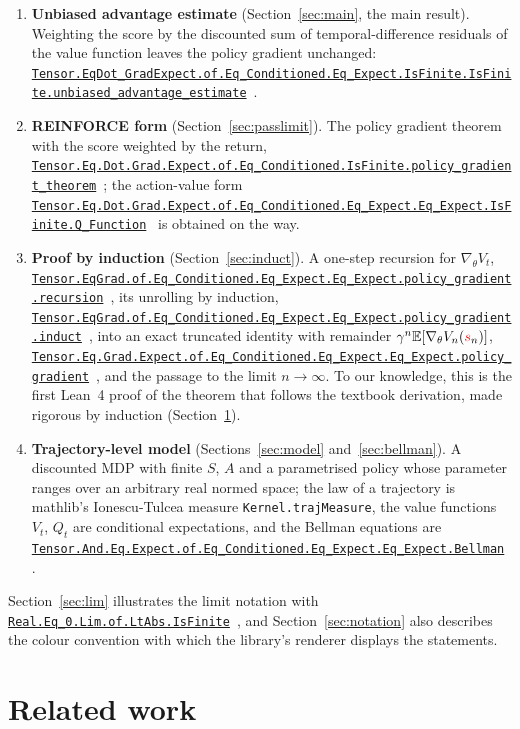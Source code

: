\documentclass[11pt,a4paper]{article}
\newcommand{\lmod}[1]{\href{http://www.lemma.cn/lean/?module=#1}{\nolinkurl{#1}}}
\newcommand{\E}{\mathbb{E}}
\newcommand{\rv}[1]{{\color{red}#1}}       %
\newcommand{\sv}{\rv{s}}
\newcommand{\grad}{\nabla_{\theta}}
\begin{document}
\begin{enumerate}[leftmargin=1.6em,itemsep=0.35em]
  \item \textbf{Unbiased advantage estimate} (Section~\ref{sec:main}, the main result). Weighting the score by the discounted sum of temporal-difference residuals of the value function leaves the policy gradient unchanged: \lmod{Tensor.EqDot_GradExpect.of.Eq_Conditioned.Eq_Expect.IsFinite.IsFinite.unbiased_advantage_estimate}~\cite{lemma_uae}.
  \item \textbf{REINFORCE form} (Section~\ref{sec:passlimit}). The policy gradient theorem with the score weighted by the return, \lmod{Tensor.Eq.Dot.Grad.Expect.of.Eq_Conditioned.IsFinite.policy_gradient_theorem}~\cite{lemma_pgt}; the action-value form \lmod{Tensor.Eq.Dot.Grad.Expect.of.Eq_Conditioned.Eq_Expect.Eq_Expect.IsFinite.Q_Function}~\cite{lemma_pgq} is obtained on the way.
  \item \textbf{Proof by induction} (Section~\ref{sec:induct}). A one-step recursion for $\grad V_t$, \lmod{Tensor.EqGrad.of.Eq_Conditioned.Eq_Expect.Eq_Expect.policy_gradient.recursion}~\cite{lemma_recursion}, its unrolling by induction, \lmod{Tensor.EqGrad.of.Eq_Conditioned.Eq_Expect.Eq_Expect.policy_gradient.induct}~\cite{lemma_induct}, into an exact truncated identity with remainder $\gamma^n\E[\grad V_n(\sv_n)]$, \lmod{Tensor.Eq.Grad.Expect.of.Eq_Conditioned.Eq_Expect.Eq_Expect.policy_gradient}~\cite{lemma_pgn}, and the passage to the limit $n\to\infty$. To our knowledge, this is the first Lean~4 proof of the theorem that follows the textbook derivation, made rigorous by induction (Section~\ref{sec:related}).
  \item \textbf{Trajectory-level model} (Sections~\ref{sec:model} and~\ref{sec:bellman}). A discounted MDP with finite $S$, $A$ and a parametrised policy whose parameter ranges over an arbitrary real normed space; the law of a trajectory is mathlib's Ionescu-Tulcea measure \texttt{Kernel.trajMeasure}, the value functions $V_t$, $Q_t$ are conditional expectations, and the Bellman equations are \lmod{Tensor.And.Eq.Expect.of.Eq_Conditioned.Eq_Expect.Eq_Expect.Bellman}~\cite{lemma_bellman}.
\end{enumerate}
Section~\ref{sec:lim} illustrates the limit notation with \lmod{Real.Eq_0.Lim.of.LtAbs.IsFinite}~\cite{lemma_lim}, and Section~\ref{sec:notation} also describes the colour convention with which the library's renderer displays the statements.

\section{Related work}
\label{sec:related}
\end{document}
